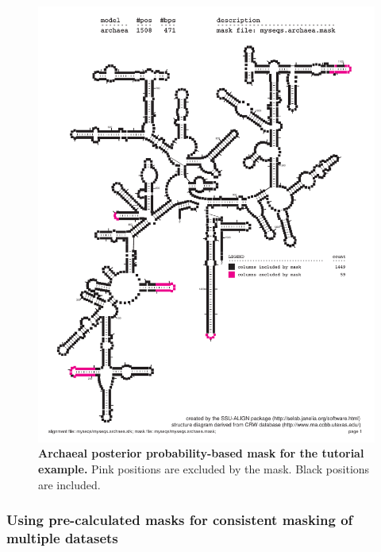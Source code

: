 \begin{figure}
  \begin{center}
\includegraphics[width=5.7in]{Figures/myseqs-archaea-mask}
  \end{center}
\caption{\textbf{Archaeal posterior probability-based mask for the
    tutorial example.}
  Pink positions are excluded by the mask. Black positions are
  included.}
\label{fig:myseqs-archaea-mask}
\end{figure}

\subsubsection{Using pre-calculated masks for consistent masking of
  multiple datasets}

